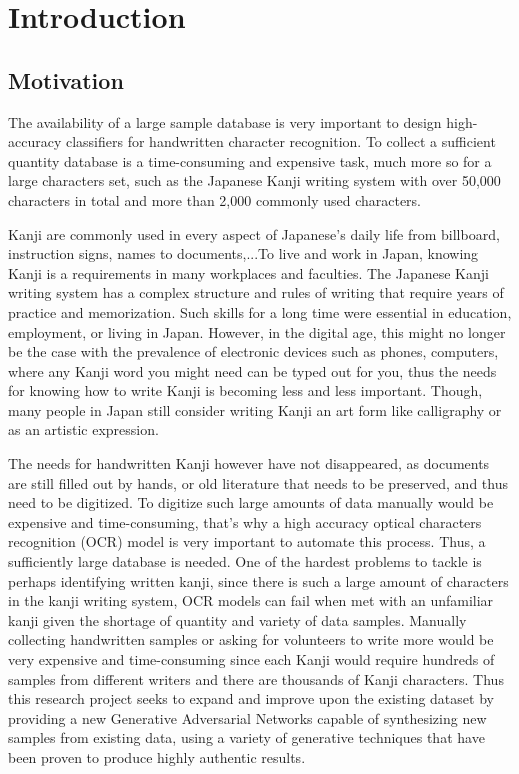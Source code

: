 \documentclass[12pt]{report}
\begin{document}
\newpage
{}
\listoffigures

\newpage
{}
\setcounter{page}{1}
\chapter{Introduction}
\label{chap:intro}

\section{Motivation}
The availability of a large sample database is very important to design high-accuracy classifiers for handwritten character recognition. To collect a sufficient quantity database is a time-consuming and expensive task, much more so for a large characters set, such as the Japanese Kanji writing system with over 50,000 characters in total and more than 2,000 commonly used characters. 

Kanji are commonly used in every aspect of Japanese’s daily life from billboard, instruction signs, names to documents,...To live and work in Japan, knowing Kanji is a requirements in many workplaces and faculties. The Japanese Kanji writing system has a complex structure and rules of writing that require years of practice and memorization. Such skills for a long time were
essential in education, employment, or living in Japan. However, in the digital age,
this might no longer be the case with the prevalence of electronic devices such as
phones, computers, where any Kanji word you might need can be typed out for you, thus the needs for knowing how to write Kanji is becoming less and less important. Though, many people in Japan still consider writing Kanji an art form like calligraphy
or as an artistic expression. 

The needs for handwritten Kanji however have not disappeared, as documents are still filled out by hands, or old literature that needs to be preserved, and thus need to be digitized. To digitize such large amounts of data manually would be expensive and time-consuming, that’s why a high accuracy optical characters recognition (OCR) model is very important to automate this process. Thus, a sufficiently large database is needed. One of the hardest problems to tackle is perhaps identifying written kanji, since there
is such a large amount of characters in the kanji writing system, OCR models can fail when met with an unfamiliar kanji given the shortage of quantity and variety of data samples. Manually collecting handwritten samples or asking for volunteers to write more would be very expensive and time-consuming since each Kanji would require hundreds of samples from different writers and there are thousands of Kanji characters. Thus this research project seeks to expand and improve upon the existing dataset by providing a new Generative Adversarial Networks capable of synthesizing new samples from existing data, using a variety of generative techniques
that have been proven to produce highly authentic results.
\end{document}
